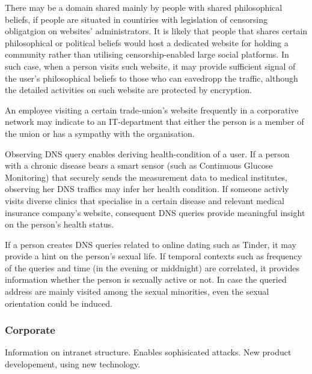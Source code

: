 There may be a domain shared mainly by people with shared philosophical beliefs, if people are situated in countiries with legislation of censorsing obligatgion on websites' administrators.
It is likely that people that shares certain philosophical or political beliefs would host a dedicated website for holding a community rather than utilising censorship-enabled large social platforms.
In such case, when a person visits such website, it may provide sufficient signal of the user's philosophical beliefs to those who can eavedropp the traffic, although the detailed activities on such website are protected by encryption.

An employee visiting a certain trade-union's website frequently in a corporative network may indicate to an IT-department that either the person is a member of the union or has a sympathy with the organisation. 

Observing DNS query enables deriving health-condition of a user. If a person with a chronic disease bears a smart sensor (such as Continuous Glucose Monitoring) that securely sends the measurement data to medical institutes, observing her DNS traffics may infer her health condition.
If someone activly visits diverse clinics that specialise in a certain disease and relevant medical insurance company's website, consequent DNS queries provide meaningful insight on the person's health status.

If a person creates DNS queries related to online dating such as Tinder, it may provide a hint on the person's sexual life. If temporal contexts such as frequency of the queries and time (in the evening or middnight) are correlated, it provides information whether the person is sexually active or not.
In case the queried address are mainly visited among the sexual minorities, even the sexual orientation could be induced.


\subsubsection{Corporate} 
Information on intranet structure. Enables sophisicated attacks.
New product developement, using new technology. 